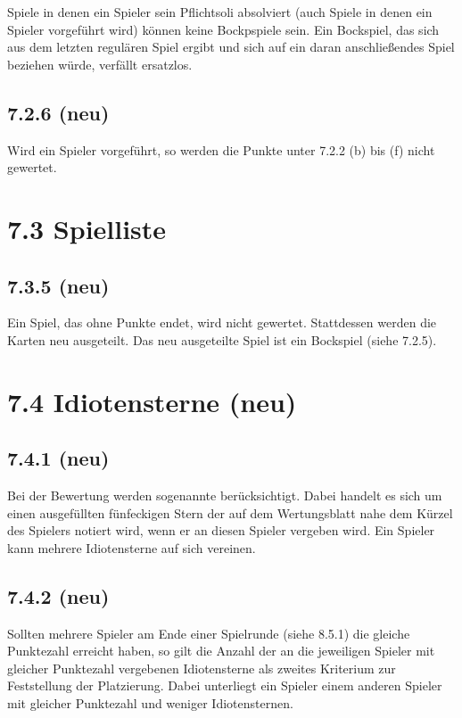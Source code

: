 Spiele in denen ein Spieler sein Pflichtsoli absolviert (auch Spiele in denen
ein Spieler vorgeführt wird) können keine Bockpspiele sein. Ein Bockspiel, das
sich aus dem letzten regulären Spiel ergibt und sich auf ein daran
anschließendes Spiel beziehen würde, verfällt ersatzlos.

\subsection*{7.2.6 (neu)}

Wird ein Spieler vorgeführt, so werden die Punkte unter 7.2.2 (b) bis
(f) nicht gewertet.

\section*{7.3 Spielliste}

\subsection*{7.3.5 (neu)}

Ein Spiel, das ohne Punkte endet, wird nicht gewertet. Stattdessen
werden die Karten neu ausgeteilt. Das neu ausgeteilte Spiel ist ein
Bockspiel (siehe 7.2.5).

\section*{7.4 Idiotensterne (neu)}

\subsection*{7.4.1 (neu)}

Bei der Bewertung werden sogenannte  berücksichtigt. Dabei
handelt es sich um einen ausgefüllten fünfeckigen Stern der auf dem
Wertungsblatt nahe dem Kürzel des Spielers notiert wird, wenn er an diesen
Spieler vergeben wird. Ein Spieler kann mehrere Idiotensterne auf sich vereinen.

\subsection*{7.4.2 (neu)}

Sollten mehrere Spieler am Ende einer Spielrunde (siehe 8.5.1) die gleiche
Punktezahl erreicht haben, so gilt die Anzahl der an die jeweiligen Spieler mit
gleicher Punktezahl vergebenen Idiotensterne als zweites Kriterium zur
Feststellung der Platzierung. Dabei unterliegt ein Spieler einem anderen Spieler
mit gleicher Punktezahl und weniger Idiotensternen.


